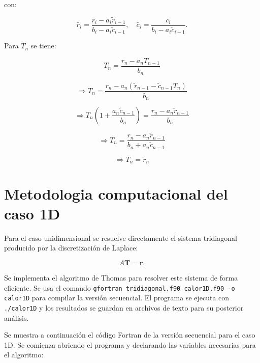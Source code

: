 \documentclass[11pt,a4paper]{article}
\begin{document}
con:

\begin{equation}
\tilde{r_i} = \frac{r_i - a_i \tilde{r}_{i-1}}{b_i - a_i \tilde{c}_{i-1}}, \quad
\tilde{c_i} = \frac{c_i}{b_i - a_i \tilde{c}_{i-1}}.
\end{equation}

Para $T_n$ se tiene:

\begin{equation}
T_n = \frac{r_n - a_n T_{n-1}}{b_n}
\end{equation}

\begin{equation}
\Rightarrow T_n = \frac{r_n - a_n 
\left( \tilde{r}_{n-1} - \tilde{c}_{n-1} T_{n} \right)}{b_n}
\end{equation}

\begin{equation}
\Rightarrow T_n \left(1 + \frac{a_n \tilde{c}_{n-1}}{b_n}\right) 
= \frac{r_n - a_n \tilde{r}_{n-1}}{b_n}
\end{equation}

\begin{equation}
\Rightarrow T_n = \frac{r_n - a_n \tilde{r}_{n-1}}{b_n + a_n \tilde{c}_{n-1}}
\end{equation}

\begin{equation}
\Rightarrow T_n = \tilde{r}_n
\end{equation}

\section{Metodologia computacional del caso 1D}

Para el caso unidimensional se resuelve directamente el sistema tridiagonal
producido por la discretizaci\'on de Laplace:

\begin{equation}
A\mathbf{T}=\mathbf{r}.
\end{equation}

Se implementa el algoritmo de Thomas para resolver este sistema de forma 
eficiente. Se usa el comando \verb|gfortran tridiagonal.f90 calor1D.f90 -o calor1D| 
para compilar la versi\'on secuencial. El programa se ejecuta con \verb|./calor1D| 
y los resultados se guardan en archivos de texto para su posterior an\'alisis.

\medskip{}

Se muestra a continuaci\'on el c\'odigo Fortran de la versi\'on secuencial 
para el caso 1D. Se comienza abriendo el programa y declarando las variables 
necesarias para el algoritmo:
\end{document}
